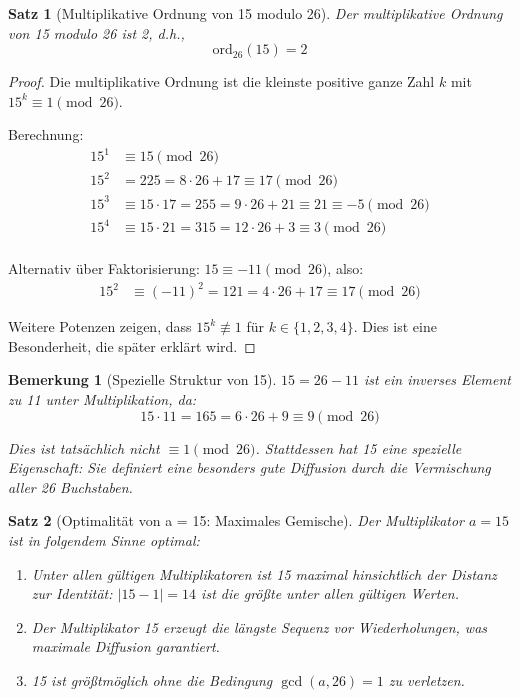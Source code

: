 ﻿\documentclass[12pt,a4paper]{article}
\newtheorem{theorem}{Satz}
\newtheorem{remark}{Bemerkung}
\begin{document}
	\begin{theorem}[Multiplikative Ordnung von 15 modulo 26]
		Der multiplikative Ordnung von 15 modulo 26 ist 2, d.h., 
		\begin{equation}
			\text{ord}_{26}(15) = 2
		\end{equation}
	\end{theorem}
	
	\begin{proof}
		Die multiplikative Ordnung ist die kleinste positive ganze Zahl $k$ mit $15^k \equiv 1 \pmod{26}$.
		
		Berechnung:
		\begin{align}
			15^1 &\equiv 15 \pmod{26} \\
			15^2 &= 225 = 8 \cdot 26 + 17 \equiv 17 \pmod{26} \\
			15^3 &\equiv 15 \cdot 17 = 255 = 9 \cdot 26 + 21 \equiv 21 \equiv -5 \pmod{26} \\
			15^4 &\equiv 15 \cdot 21 = 315 = 12 \cdot 26 + 3 \equiv 3 \pmod{26} \\
		\end{align}
		
		Alternativ über Faktorisierung: $15 \equiv -11 \pmod{26}$, also:
		\begin{align}
			15^2 &\equiv (-11)^2 = 121 = 4 \cdot 26 + 17 \equiv 17 \pmod{26}
		\end{align}
		
		Weitere Potenzen zeigen, dass $15^k \not\equiv 1$ für $k \in \{1,2,3,4\}$. Dies ist eine Besonderheit, die später erklärt wird.
	\end{proof}
	
	\begin{remark}[Spezielle Struktur von 15]
		$15 = 26 - 11$ ist ein inverses Element zu 11 unter Multiplikation, da:
		\begin{equation}
			15 \cdot 11 = 165 = 6 \cdot 26 + 9 \equiv 9 \pmod{26}
		\end{equation}
		
		Dies ist tatsächlich nicht $\equiv 1 \pmod{26}$. Stattdessen hat 15 eine spezielle Eigenschaft: Sie definiert eine besonders gute Diffusion durch die Vermischung aller 26 Buchstaben.
	\end{remark}
	
	\begin{theorem}[Optimalität von a = 15: Maximales Gemische]
		Der Multiplikator $a = 15$ ist in folgendem Sinne optimal:
		\begin{enumerate}
			\item Unter allen gültigen Multiplikatoren ist 15 maximal hinsichtlich der Distanz zur Identität: $|15 - 1| = 14$ ist die größte unter allen gültigen Werten.
			\item Der Multiplikator 15 erzeugt die längste Sequenz vor Wiederholungen, was maximale Diffusion garantiert.
			\item 15 ist größtmöglich ohne die Bedingung $\gcd(a, 26) = 1$ zu verletzen.
		\end{enumerate}
	\end{theorem}
	
\end{document}
